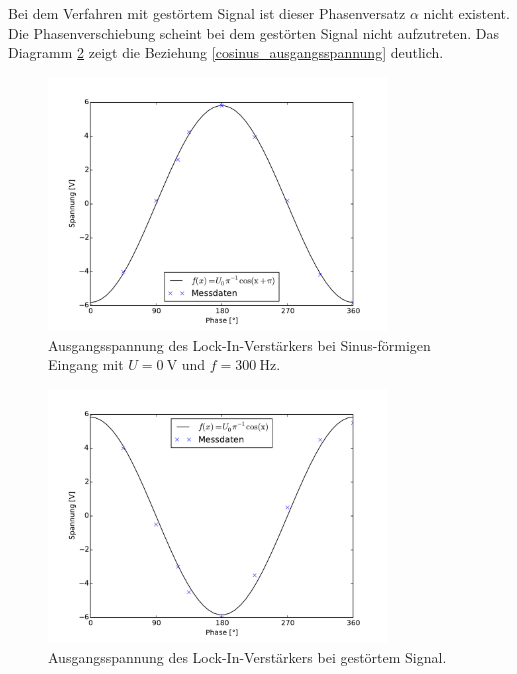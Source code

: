 Bei dem Verfahren mit gestörtem Signal ist dieser Phasenversatz $\alpha$ nicht existent.
Die Phasenverschiebung scheint bei dem gestörten Signal nicht aufzutreten.
Das Diagramm \ref{diag:stoerung} zeigt die Beziehung \eqref{cosinus_ausgangsspannung} deutlich.
\begin{figure}[hp]
	\centering
	\includegraphics[width=0.8\textwidth]{Bilder/AusgangSpannung.pdf}
	\caption{Ausgangsspannung des Lock-In-Verstärkers bei Sinus-förmigen Eingang mit $U = \SI{0}{\volt}$ und $f = \SI{300}{\hertz}$.}
	\label{diag:spannung}
\end{figure}

\begin{figure}[hp]
	\centering
	\includegraphics[width=0.8\textwidth]{Bilder/AusgangStoerung.pdf}
	\caption{Ausgangsspannung des Lock-In-Verstärkers bei gestörtem Signal.}
	\label{diag:stoerung}
\end{figure}

